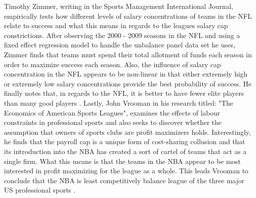 \documentclass[12pt,english]{article}
\begin{document}
 \newline
 Timothy Zimmer, writing in the Sports Management International Journal, empirically tests how different levels of salary concentrations of teams in the NFL relate to success and what this means in regards to the leagues salary cap constrictions. After observing the 2000 - 2009 seasons in the NFL and using a fixed effect regression model to handle the unbalance panel data set he uses, Zimmer finds that teams must spend their total allotment of funds each season in order to maximize success each season. Also, the influence of salary cap concentration in the NFL appears to be non-linear in that either extremely high or extremely low salary concentrations provide the best probability of success. He finally notes that, in regards to the NFL, it is better to have fewer elite players than many good players \cite{zimmer}. 
 \newline
 Lastly, John Vrooman in his research titled: "The Economics of American Sports Leagues", examines the effects of labour constraints in professional sports and also seeks to discover whether the assumption that owners of sports clubs are profit maximizers holds. Interestingly, he finds that the payroll cap is a unique form of cost-sharing collusion and that its introduction into the NBA has created a sort of cartel of teams that act as a single firm. What this means is that the teams in the NBA appear to be most interested in profit maximizing for the league as a whole. This leads Vrooman to conclude that the NBA is least competitively balance league of the three major US professional sports \cite{vrooman}. 
 
 
 
 
 
\end{document}
